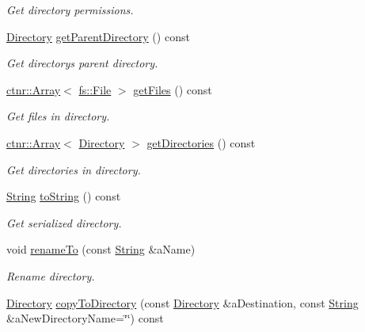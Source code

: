 \begin{DoxyCompactItemize}
\begin{DoxyCompactList}\small\item\em Get directory permissions. \end{DoxyCompactList}\item 
\hyperlink{classlibrary_1_1core_1_1fs_1_1_directory}{Directory} \hyperlink{classlibrary_1_1core_1_1fs_1_1_directory_ad17e782b4937e026064cf90e5b6150e6}{get\+Parent\+Directory} () const
\begin{DoxyCompactList}\small\item\em Get directory\textquotesingle{}s parent directory. \end{DoxyCompactList}\item 
\hyperlink{classlibrary_1_1core_1_1ctnr_1_1_array}{ctnr\+::\+Array}$<$ \hyperlink{classlibrary_1_1core_1_1fs_1_1_file}{fs\+::\+File} $>$ \hyperlink{classlibrary_1_1core_1_1fs_1_1_directory_a9c80c3a09389bb6f024e9a9001dea432}{get\+Files} () const
\begin{DoxyCompactList}\small\item\em Get files in directory. \end{DoxyCompactList}\item 
\hyperlink{classlibrary_1_1core_1_1ctnr_1_1_array}{ctnr\+::\+Array}$<$ \hyperlink{classlibrary_1_1core_1_1fs_1_1_directory}{Directory} $>$ \hyperlink{classlibrary_1_1core_1_1fs_1_1_directory_a31ef325dea750ce2d7ecca49258c2a9a}{get\+Directories} () const
\begin{DoxyCompactList}\small\item\em Get directories in directory. \end{DoxyCompactList}\item 
\hyperlink{classlibrary_1_1core_1_1types_1_1_string}{String} \hyperlink{classlibrary_1_1core_1_1fs_1_1_directory_a9d9751fccc93342105d3ea3ee29e3a9f}{to\+String} () const
\begin{DoxyCompactList}\small\item\em Get serialized directory. \end{DoxyCompactList}\item 
void \hyperlink{classlibrary_1_1core_1_1fs_1_1_directory_a895ac94a625098aa05a2239cfaf5359b}{rename\+To} (const \hyperlink{classlibrary_1_1core_1_1types_1_1_string}{String} \&a\+Name)
\begin{DoxyCompactList}\small\item\em Rename directory. \end{DoxyCompactList}\item 
\hyperlink{classlibrary_1_1core_1_1fs_1_1_directory}{Directory} \hyperlink{classlibrary_1_1core_1_1fs_1_1_directory_a47e5e9a14af43a55dd45283b62baf482}{copy\+To\+Directory} (const \hyperlink{classlibrary_1_1core_1_1fs_1_1_directory}{Directory} \&a\+Destination, const \hyperlink{classlibrary_1_1core_1_1types_1_1_string}{String} \&a\+New\+Directory\+Name=\char`\"{}\char`\"{}) const

\end{DoxyCompactItemize}
